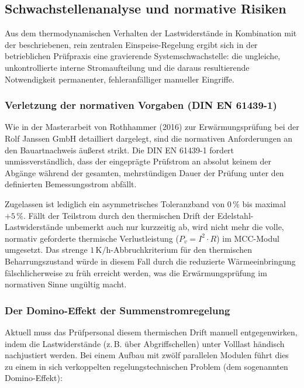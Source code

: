 \subsection{Schwachstellenanalyse und normative Risiken}
\label{sec:schwachstellenanalyse}

Aus dem thermodynamischen Verhalten der Lastwiderstände in Kombination mit der beschriebenen, rein zentralen Einspeise-Regelung ergibt sich in der betrieblichen Prüfpraxis eine gravierende Systemschwachstelle: die ungleiche, unkontrollierte interne Stromaufteilung und die daraus resultierende Notwendigkeit permanenter, fehleranfälliger manueller Eingriffe.
\subsubsection{Verletzung der normativen Vorgaben (DIN EN 61439-1)}
\label{sec:verletzung_norm}
Wie in der Masterarbeit von Rothhammer (2016) zur Erwärmungsprüfung bei der Rolf Janssen GmbH detailliert dargelegt, sind die normativen Anforderungen an den Bauartnachweis äußerst strikt. Die DIN EN 61439-1 fordert unmissverständlich, dass der eingeprägte Prüfstrom an absolut keinem der Abgänge während der gesamten, mehrstündigen Dauer der Prüfung unter den definierten Bemessungsstrom abfällt. 

Zugelassen ist lediglich ein asymmetrisches Toleranzband von $0\,\%$ bis maximal $+5\,\%$. Fällt der Teilstrom durch den thermischen Drift der Edelstahl-Lastwiderstände unbemerkt auch nur kurzzeitig ab, wird nicht mehr die volle, normativ geforderte thermische Verlustleistung ($P_v = I^2 \cdot R$) im MCC-Modul umgesetzt. Das strenge $1\,\text{K/h}$-Abbruchkriterium für den thermischen Beharrungszustand würde in diesem Fall durch die reduzierte Wärmeeinbringung fälschlicherweise zu früh erreicht werden, was die Erwärmungsprüfung im normativen Sinne ungültig macht.
\subsubsection{Der Domino-Effekt der Summenstromregelung}
\label{sec:gegenseitige_beeinflussung}
Aktuell muss das Prüfpersonal diesem thermischen Drift manuell entgegenwirken, indem die Lastwiderstände (z.\,B. über Abgriffschellen) unter Volllast händisch nachjustiert werden. Bei einem Aufbau mit zwölf parallelen Modulen führt dies zu einem in sich verkoppelten regelungstechnischen Problem (dem sogenannten Domino-Effekt):

